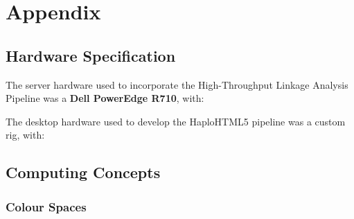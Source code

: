 \chapter{Appendix}

\section{Hardware Specification}\label{ref:app:hwspec}

The server hardware used to incorporate the High-Throughput Linkage Analysis Pipeline was a \textbf{Dell PowerEdge R710}, with:
\begin{spacing}{1.2}
\begin{itemize}
\end{itemize}
\end{spacing}

\noindent
The desktop hardware used to develop the HaploHTML5 pipeline was a custom rig, with:
\begin{spacing}{1.2}
\begin{itemize}
\end{itemize}
\end{spacing}




\section{Computing Concepts}

\subsection{Colour Spaces}\label{ref:app:colour}

